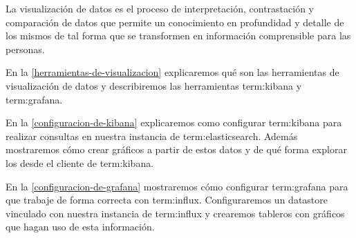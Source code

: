 La visualización de datos es el proceso de interpretación, contrastación y
comparación de datos que permite un conocimiento en profundidad y detalle de
los mismos de tal forma que se transformen en información comprensible para las
personas.

En la \autoref{herramientas-de-visualizacion} explicaremos qué son las
herramientas de visualización de datos y describiremos las herramientas
\gls{term:kibana} y \gls{term:grafana}.

En la \autoref{configuracion-de-kibana} explicaremos como configurar
\gls{term:kibana} para realizar consultas en nuestra instancia de
\gls{term:elasticsearch}. Además mostraremos cómo crear gráficos a partir de
estos datos y de qué forma explorar los  desde el cliente  de
\gls{term:kibana}.

En la \autoref{configuracion-de-grafana} mostraremos cómo configurar
\gls{term:grafana} para que trabaje de forma correcta con \gls{term:influx}.
Configuraremos un datastore vinculado con nuestra instancia de \gls{term:influx} y
crearemos tableros con gráficos que hagan uso de esta información.
